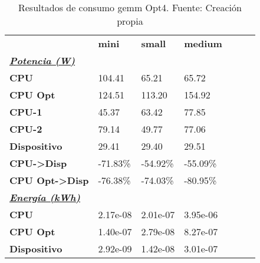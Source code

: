\begin{table}[H]
    \centering
    \begin{tabular}{lllllll}
    \rowcolor[HTML]{DAE8FC} \ & \textbf{mini} & \textbf{	small} & \textbf{	medium} \\
    \cellcolor[HTML]{DAE8FC} \textbf{\textbf{{\emph{{\underline{{Potencia (W)}}}}}}} &  & 	 & 	 \\
    \rowcolor[HTML]{EFEFEF} \cellcolor[HTML]{DAE8FC} \textbf{CPU} & 104.41 & 	65.21 & 	65.72 \\
    \cellcolor[HTML]{DAE8FC} \textbf{CPU Opt} & 124.51 & 	113.20 & 	154.92 \\
    \rowcolor[HTML]{EFEFEF} \cellcolor[HTML]{DAE8FC} \textbf{\quad CPU-1} & 45.37 & 	63.42 & 	77.85 \\
    \cellcolor[HTML]{DAE8FC} \textbf{\quad CPU-2} & 79.14 & 	49.77 & 	77.06 \\
    \rowcolor[HTML]{EFEFEF} \cellcolor[HTML]{DAE8FC} \textbf{Dispositivo} & 29.41 & 	29.40 & 	29.51 \\
    \cellcolor[HTML]{DAE8FC} \textbf{CPU->Disp} & -71.83\% & 	-54.92\% & 	-55.09\% \\
    \rowcolor[HTML]{EFEFEF} \cellcolor[HTML]{DAE8FC} \textbf{CPU Opt->Disp} & -76.38\% & 	-74.03\% & 	-80.95\% \\
    \cellcolor[HTML]{DAE8FC} \textbf{\textbf{{\emph{{\underline{{Energía (kWh)}}}}}}} &  & 	 & 	 \\
    \rowcolor[HTML]{EFEFEF} \cellcolor[HTML]{DAE8FC} \textbf{CPU} & 2.17e-08 & 	2.01e-07 & 	3.95e-06 \\
    \cellcolor[HTML]{DAE8FC} \textbf{CPU Opt} & 1.40e-07 & 	2.79e-08 & 	8.27e-07 \\
    \rowcolor[HTML]{EFEFEF} \cellcolor[HTML]{DAE8FC} \textbf{Dispositivo} & 2.92e-09 & 	1.42e-08 & 	3.01e-07 \\
    \end{tabular}
    \caption[Resultados de consumo gemm Opt4]{{Resultados de consumo gemm Opt4. Fuente: Creación propia}}
    \label{table_test_gemm_Opt4_hw_powerResults}
\end{table}